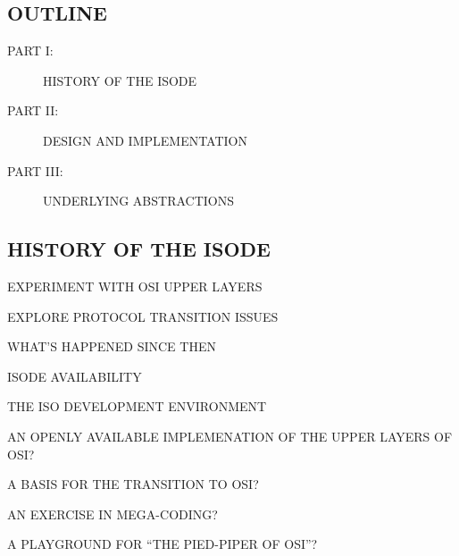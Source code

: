

\begin{bwslide}
\part*	{OUTLINE}\bf

\begin{description}
\item[PART I:]		HISTORY OF THE ISODE

\item[PART II:]		DESIGN AND IMPLEMENTATION

\item[PART III:]	UNDERLYING ABSTRACTIONS
\end{description}
\end{bwslide}


\begin{bwslide}
\part	{HISTORY OF THE ISODE}\bf

\begin{nrtc}
\item	EXPERIMENT WITH OSI UPPER LAYERS

\item	EXPLORE PROTOCOL TRANSITION ISSUES

\item	WHAT'S HAPPENED SINCE THEN

\item	ISODE AVAILABILITY
\end{nrtc}
\end{bwslide}


\begin{bwslide}

\begin{nrtc}
\item	THE ISO DEVELOPMENT ENVIRONMENT

\item	AN OPENLY AVAILABLE IMPLEMENATION OF THE UPPER LAYERS OF OSI?

\item	A BASIS FOR THE TRANSITION TO OSI?

\item	AN EXERCISE IN MEGA-CODING?

\item	A PLAYGROUND FOR ``THE PIED-PIPER OF OSI''?
\end{nrtc}
\end{bwslide}


